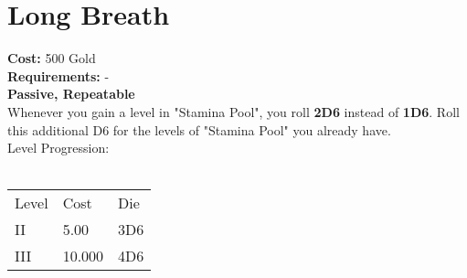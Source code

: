 \section{Long Breath}\label{sec:longbreath}
\textbf{Cost:} 500 Gold\\
\textbf{Requirements:} -\\
\textbf{Passive, Repeatable}\\
Whenever you gain a level in "Stamina Pool", you roll \textbf{2D6} instead of \textbf{1D6}.
Roll this additional D6 for the levels of "Stamina Pool" you already have.\\
Level Progression:\\
\\
\begin{tabular}{l | l | l }
	Level & Cost & Die\\
	II & 5.00 & 3D6 \\
	III & 10.000 & 4D6\\
\end{tabular}